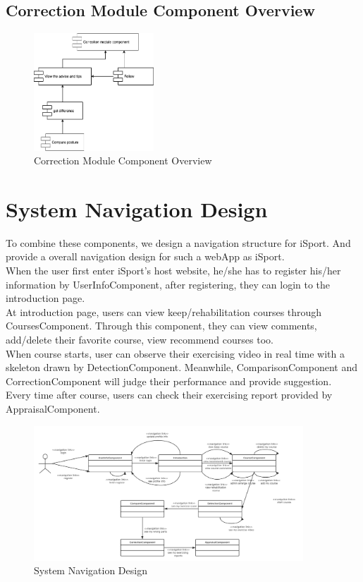 \documentclass[16pt]{scrreprt}
\begin{document}
\subsection{Correction Module Component Overview}
\begin{figure}[H]
    \centering
    \includegraphics[width=0.4\textwidth]{diagrams/correction.png}
    \caption{Correction Module Component Overview}
\end{figure}

\section{System Navigation Design}
To combine these components, we design a navigation structure for iSport. And provide a overall navigation design for such a webApp as iSport. \\

\noindent When the user first enter iSport's host website, he/she has to register his/her information by UserInfoComponent, after registering, they can login to the introduction page.\\

\noindent At introduction page, users can view keep/rehabilitation courses through CoursesComponent. Through this component, they can view comments, add/delete their favorite course, view recommend courses too.\\

\noindent When course starts, user can observe their exercising video in real time with a skeleton drawn by DetectionComponent. Meanwhile, ComparisonComponent and CorrectionComponent will judge their performance and provide suggestion.\\

\noindent Every time after course, users can check their exercising report provided by AppraisalComponent.  
\begin{figure}[H]
  \centering
  \includegraphics[width=0.9\textwidth]{diagrams/navigation.png}
  \caption{System Navigation Design}
\end{figure}
\end{document}
